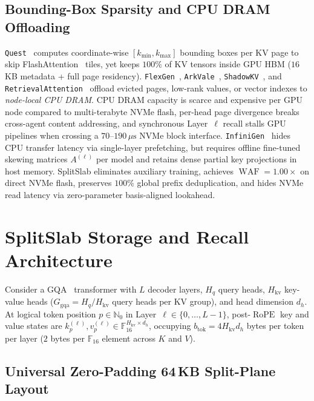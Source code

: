 \documentclass[10pt,journal,compsoc]{IEEEtran}
\theoremstyle{definition}
\theoremstyle{remark}
\newcommand{\SplitSlab}{\textup{\textsc{SplitSlab}}}
\newcommand{\RoPE}{\operatorname{RoPE}}
\newcommand{\WAF}{\operatorname{WAF}}
\def\SplitSlab{SplitSlab}%
\begin{document}
\subsection{Bounding-Box Sparsity and CPU DRAM Offloading}
\texttt{Quest}~\cite{tang2024quest} computes coordinate-wise $[k_{\min}, k_{\max}]$ bounding boxes per KV page to skip FlashAttention~\cite{dao2022flashattention} tiles, yet keeps $100\%$ of KV tensors inside GPU HBM ($16$\,KB metadata + full page residency). \texttt{FlexGen}~\cite{sheng2023flexgen}, \texttt{ArkVale}~\cite{chen2024arkvale}, \texttt{ShadowKV}~\cite{sun2025shadowkv}, and \texttt{RetrievalAttention}~\cite{liu2024retrievalattention} offload evicted pages, low-rank values, or vector indexes to \emph{node-local CPU DRAM}. CPU DRAM capacity is scarce and expensive per GPU node compared to multi-terabyte NVMe flash, per-head page divergence breaks cross-agent content addressing, and synchronous Layer~$\ell$ recall stalls GPU pipelines when crossing a $70$--$190\,\mu\mathrm{s}$ NVMe block interface. \texttt{InfiniGen}~\cite{lee2024infinigen} hides CPU transfer latency via single-layer prefetching, but requires offline fine-tuned skewing matrices $A^{(\ell)}$ per model and retains dense partial key projections in host memory. \SplitSlab{} eliminates auxiliary training, achieves $\WAF = 1.00\times$ on direct NVMe flash, preserves $100\%$ global prefix deduplication, and hides NVMe read latency via zero-parameter basis-aligned lookahead.

\section{SplitSlab Storage and Recall Architecture}\label{sec:arch}

Consider a GQA~\cite{ainslie2023gqa} transformer with $L$ decoder layers, $H_q$ query heads, $H_{\mathrm{kv}}$ key-value heads ($G_{\mathrm{gqa}} = H_q / H_{\mathrm{kv}}$ query heads per KV group), and head dimension $d_h$. At logical token position $p \in \mathbb{N}_0$ in Layer~$\ell \in \{0,\dots,L-1\}$, post-$\RoPE$ key and value states are $k_p^{(\ell)}, v_p^{(\ell)} \in \mathbb{F}_{16}^{H_{\mathrm{kv}} \times d_h}$, occupying $b_{\mathrm{tok}} = 4 H_{\mathrm{kv}} d_h$ bytes per token per layer ($2$ bytes per $\mathbb{F}_{16}$ element across $K$ and $V$).

\subsection{Universal Zero-Padding 64\,KB Split-Plane Layout}\label{subsec:layout}
\end{document}
